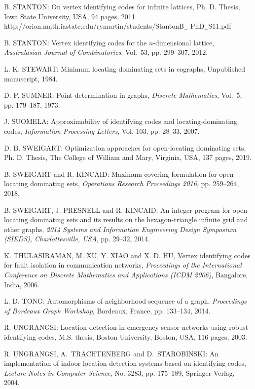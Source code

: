 \begin{thebibliography}{999}
B. STANTON: On vertex identifying codes for infinite lattices, Ph. D. Thesis, Iowa State University, USA, 94 pages, 2011.\\
http://orion.math.iastate.edu/rymartin/students/StantonB$_{-}$ PhD$_{-}$S11.pdf

B. STANTON: Vertex identifying codes for the $n$-dimensional lattice, {\it Australasian Journal of Combinatorics}, Vol.~53, pp. 299--307, 2012.

L. K. STEWART: Minimum locating dominating sets in cographs, Unpublished manuscript, 1984.

 D. P. SUMNER: Point determination in graphs, {\it Discrete Mathematics}, Vol.~5, pp. 179--187, 1973.

J. SUOMELA: Approximability of identifying codes and locating-dominating codes, {\it Information Processing Letters}, Vol. 103, pp. 28--33, 2007.

D. B. SWEIGART:  Optimization approaches for open-locating dominating sets, Ph. D. Thesis, The College of William and Mary, Virginia, USA, 137 pages, 2019.

B. SWEIGART and R. KINCAID: Maximum covering formulation for open locating dominating sets, {\it Operations Research Proceedings 2016}, pp. 259--264, 2018.

B. SWEIGART, J. PRESNELL and R. KINCAID: An integer program for open locating dominating sets and its results on the hexagon-triangle infinite grid and other graphs, {\it 2014 Systems and Information Engineering Design Symposium (SIEDS), Charlottesville, USA}, pp. 29--32, 2014.
 
K. THULASIRAMAN, M. XU, Y. XIAO and X. D. HU, Vertex identifying codes for fault isolation in communication networks, {\it Proceedings of the International Conference on Discrete Mathematics and Applications (ICDM 2006)}, Bangalore, India, 2006.

L. D. TONG: Automorphisms of neighborhood sequence of a graph, {\it Proceedings of Bordeaux Graph Workshop}, Bordeaux, France, pp. 133--134, 2014.

R. UNGRANGSI: Location detection in emergency sensor networks using robust identifying codes, M.S. thesis, Boston University, Boston, USA, 116 pages, 2003.

R. UNGRANGSI, A.~TRACHTENBERG and D.~STAROBINSKI: An implementation of indoor location detection systems based on identifying codes, {\it Lecture Notes in Computer Science}, No. 3283, pp. 175--189, Springer-Verlag, 2004.


\end{thebibliography}
